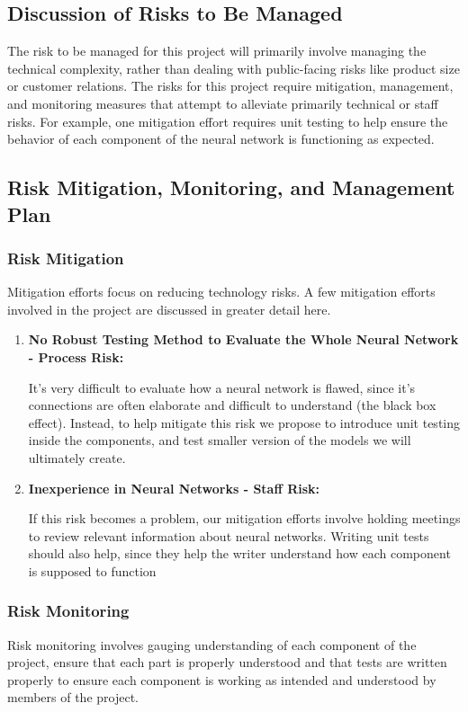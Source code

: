 \documentclass[english,12pt]{article}
\begin{document}
\subsection{Discussion of Risks to Be Managed}
The risk to be managed for this project will primarily involve managing the technical complexity,
rather than dealing with public-facing risks like product size or customer relations. The risks for 
this project require mitigation, management, and monitoring
 measures that attempt to alleviate primarily technical or staff risks. For example,
one mitigation effort requires unit testing to help ensure the behavior of each component
of the neural network is functioning as expected.
\pagebreak
\subsection{Risk Mitigation, Monitoring, and Management Plan}
\subsubsection{Risk Mitigation}
Mitigation efforts focus on reducing technology risks. A few mitigation efforts
involved in the project are discussed in greater detail here.
\begin{enumerate}[1.]
  \item \textbf{No Robust Testing Method to Evaluate the Whole Neural Network - Process Risk:}

  It's very difficult to evaluate how a neural network is flawed, since it's connections
  are often elaborate and difficult to understand (the black box effect). Instead, to help mitigate this risk we propose to introduce unit testing inside the components, and test smaller version
  of the models we will ultimately create.

  \item \textbf{Inexperience in Neural Networks - Staff Risk:}

  If this risk becomes a problem, our mitigation efforts involve
  holding meetings to review relevant information about neural networks. 
  Writing unit tests should also help, since they help the writer understand
  how each component is supposed to function

\end{enumerate}
\subsubsection{Risk Monitoring}
Risk monitoring involves gauging understanding of each component of the project, ensure
that each part is properly understood and that tests are written properly to ensure each component
is working as intended and understood by members of the project.
\end{document}
